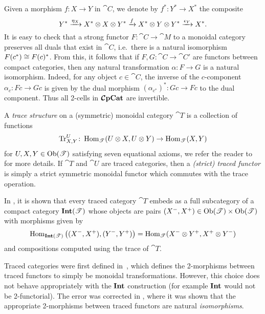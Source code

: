 \documentclass[11pt,oneside,article]{memoir}
\begin{document}
Given a morphism $f\colon X\to Y$ in $\cat{C}$, we denote by $f^*\colon Y^*\to X^*$ the composite
\begin{equation*}
  Y^*\xrightarrow{\eta_X}X^*\otimes X\otimes Y^* \xrightarrow{f}X^*\otimes Y\otimes Y^*\xrightarrow{\epsilon_Y}X^*.
\end{equation*}
It is easy to check that a strong functor $F\colon\cat{C}\to\cat{M}$ to a monoidal category
preserves all duals that exist in $\cat{C}$, i.e.\ there is a natural isomorphism $F(c^*)\cong
F(c)^*$. From this, it follows that if $F,G\colon\cat{C}\to\cat{C'}$ are functors between compact
categories, then any natural transformation $\alpha\colon F\to G$ is a natural isomorphism. Indeed,
for any object $c\in\cat{C}$, the inverse of the $c$-component $\alpha_c\colon Fc\to Gc$ is given by
the dual morphism $(\alpha_{c^*})^*\colon Gc\to Fc$ to the dual component. Thus all 2-cells in
$\bm{\mathcal{C}}\mathbf{pCat}$ are invertible.

A \emph{trace structure} on a (symmetric) monoidal category $\cat{T}$ is a collection of functions
\begin{equation}
    \label{dia:trace_function}
  \operatorname{Tr}^U_{X,Y}\colon\operatorname{Hom}_{\mathscr{T}}(U\otimes X,U\otimes Y)\to\operatorname{Hom}_{\mathscr{T}}(X,Y)
\end{equation}
for $U,X,Y\in\mathrm{Ob}(\mathscr{T})$ satisfying seven equational axioms, we refer the reader to
\cite{JoyalStreetVerity} for more details. If $\cat{T}$ and $\cat{U}$ are traced categories, then a
\emph{(strict) traced functor} is simply a strict symmetric monoidal functor which commutes with the
trace operation.

In \cite{JoyalStreetVerity}, it is shown that every traced category $\cat{T}$ embeds as a full
subcategory of a compact category $\mathbf{Int}(\mathscr{T})$ whose objects are pairs
$(X^-,X^+)\in\mathrm{Ob}(\mathscr{T})\times\mathrm{Ob}(\mathscr{T})$ with morphisms given by
\begin{equation*}
  \operatorname{Hom}_{\mathbf{Int}(\mathscr{T})}\big((X^-,X^+),(Y^-,Y^+)\big)
    = \operatorname{Hom}_{\mathscr{T}}(X^-\otimes Y^+,X^+\otimes Y^-)
\end{equation*}
and compositions computed using the trace of $\cat{T}$.

\begin{remark}
    \label{rem:traced_2morphisms}
  Traced categories were first defined in~\cite{JoyalStreetVerity}, which defines the 2-morphisms
  between traced functors to simply be monoidal transformations. However, this choice does not
  behave appropriately with the $\mathbf{Int}$ construction (for example $\mathbf{Int}$ would not be 2-functorial).
  The error was corrected in \cite{HK}, where it was shown that the appropriate 2-morphisms between
  traced functors are natural \emph{isomorphisms}.
\end{remark}
\end{document}
